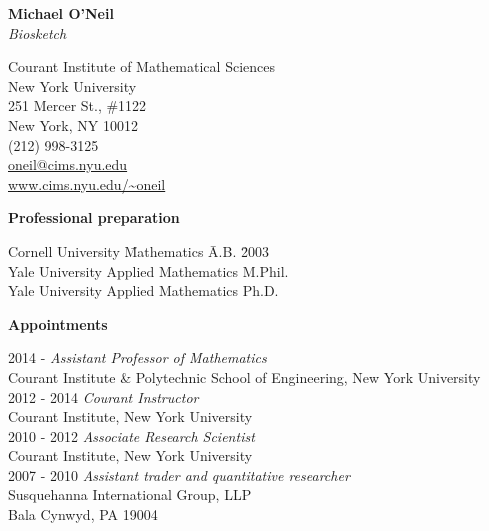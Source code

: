 \documentclass[letterpaper,12pt]{article}
\begin{document}
\begin{center}
    {\bf \large Michael O'Neil}\\
    {\em Biosketch}
\end{center}

\bigskip

\noindent
Courant Institute of Mathematical Sciences\\
New York University\\
251 Mercer St., \#1122\\
New York, NY 10012\\
(212) 998-3125\\
\url{oneil@cims.nyu.edu}\\
\url{www.cims.nyu.edu/~oneil}\\

\bigskip

\noindent
{\bf Professional preparation}
\begin{tabbing}
Cornell University \qquad \= Mathematics \qquad \qquad \qquad \= A.B. 
    \qquad \=2003\\
Yale University \> Applied Mathematics \> M.Phil.  \\
Yale University \> Applied Mathematics \> Ph.D.  \\
\end{tabbing}



\noindent
{\bf Appointments}
\begin{tabbing}
2014 - \qquad \qquad \= {\em Assistant Professor of Mathematics} \\
\> Courant Institute \& Polytechnic School of Engineering, New York
University\\
 2012 - 2014 \> {\em Courant Instructor}\\
  \>Courant Institute, New York University \\
2010 - 2012 \> {\em Associate Research Scientist} \\
       \> Courant Institute, New York University\\
2007 - 2010 \> {\em Assistant trader and quantitative
            researcher}\\
    \> Susquehanna International Group, LLP \\
    \> Bala Cynwyd, PA 19004\\
\end{tabbing}
\end{document}
